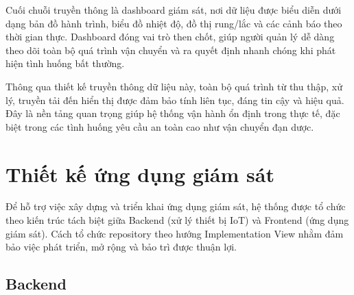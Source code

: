 Cuối chuỗi truyền thông là dashboard giám sát, nơi dữ liệu được biểu diễn dưới dạng bản đồ hành trình, biểu đồ nhiệt độ, đồ thị rung/lắc và các cảnh báo theo thời gian thực. Dashboard đóng vai trò then chốt, giúp người quản lý dễ dàng theo dõi toàn bộ quá trình vận chuyển và ra quyết định nhanh chóng khi phát hiện tình huống bất thường.

Thông qua thiết kế truyền thông dữ liệu này, toàn bộ quá trình từ thu thập, xử lý, truyền tải đến hiển thị được đảm bảo tính liên tục, đáng tin cậy và hiệu quả. Đây là nền tảng quan trọng giúp hệ thống vận hành ổn định trong thực tế, đặc biệt trong các tình huống yêu cầu an toàn cao như vận chuyển đạn dược.

\section{Thiết kế ứng dụng giám sát}
Để hỗ trợ việc xây dựng và triển khai ứng dụng giám sát, hệ thống được tổ chức theo kiến trúc tách biệt giữa Backend (xử lý thiết bị IoT) và Frontend (ứng dụng giám sát). Cách tổ chức repository theo hướng Implementation View nhằm đảm bảo việc phát triển, mở rộng và bảo trì được thuận lợi.

\subsection{Backend}




